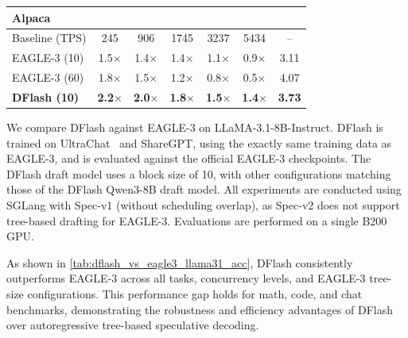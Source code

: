 \begin{table}[h!]
{\begin{tabular}{l ccccc c}
\midrule
\multicolumn{7}{l}{\textbf{Alpaca}} \\
\midrule
Baseline (TPS)
& 245 & 906 & 1745 & 3237 & 5434 & -- \\

EAGLE-3 (10)
& 1.5$\times$ & 1.4$\times$ & 1.4$\times$ & 1.1$\times$ & 0.9$\times$
& 3.11 \\

EAGLE-3 (60)
& 1.8$\times$ & 1.5$\times$ & 1.2$\times$ & 0.8$\times$ & 0.5$\times$
& 4.07 \\

\textbf{DFlash (10)}
& \textbf{2.2$\times$} & \textbf{2.0$\times$} & \textbf{1.8$\times$} & \textbf{1.5$\times$} & \textbf{1.4$\times$}
& \textbf{3.73} \\

\bottomrule
\end{tabular}
}
\end{table}
We compare DFlash against EAGLE-3 on LLaMA-3.1-8B-Instruct. DFlash is trained on UltraChat~\citep{ding2023enhancingchatlanguagemodels} and ShareGPT, using the exactly same training data as EAGLE-3, and is evaluated against the official EAGLE-3 checkpoints. The DFlash draft model uses a block size of 10, with other configurations matching those of the DFlash Qwen3-8B draft model. All experiments are conducted using SGLang with Spec-v1 (without scheduling overlap), as Spec-v2 does not support tree-based drafting for EAGLE-3. Evaluations are performed on a single B200 GPU.

As shown in \autoref{tab:dflash_vs_eagle3_llama31_acc}, DFlash consistently outperforms EAGLE-3 across all tasks, concurrency levels, and EAGLE-3 tree-size configurations. This performance gap holds for math, code, and chat benchmarks, demonstrating the robustness and efficiency advantages of DFlash over autoregressive tree-based speculative decoding.


